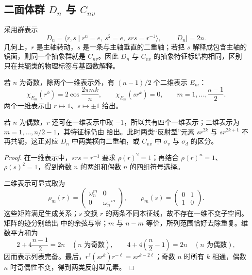 \subsection{\texorpdfstring{二面体群 $D_n$ 与 $C_{nv}$}{二面体群 Dn 与 Cnv}}

采用群表示
\[
D_n=\langle r,s\mid r^n=e,\ s^2=e,\ srs=r^{-1}\rangle,
\qquad |D_n|=2n.
\]
几何上，$r$ 是主轴转动，$s$ 是一条与主轴垂直的二重轴；若把 $s$ 解释成包含主轴的镜面，则同一个抽象群就是 $C_{nv}$。因此 $D_n$ 与 $C_{nv}$ 的抽象特征标结构相同，区别只在共轭类的物理标签与基函数解释。

\begin{theorem}[二面体群的复不可约表示]
若 $n$ 为奇数，除两个一维表示外，有 $(n-1)/2$ 个二维表示 $E_m$：
\begin{equation}
\chi_{E_m}(r^k)=2\cos\frac{2\pi mk}{n},
\qquad
\chi_{E_m}(sr^k)=0,
\qquad
m=1,\dots,\frac{n-1}{2}.
\label{eq:dn-odd-char}
\end{equation}
两个一维表示由 $r\mapsto1$、$s\mapsto\pm1$ 给出。

若 $n$ 为偶数，$r$ 还可在一维表示中取 $-1$，所以共有四个一维表示；二维表示为 $m=1,\dots,n/2-1$，其特征标仍由  给出。此时两类“反射型”元素 $sr^{2k}$ 与 $sr^{2k+1}$ 不再共轭，这正对应 $D_n$ 中两类横向二重轴，或 $C_{nv}$ 中 $\sigma_v$ 与 $\sigma_d$ 的区分。
\end{theorem}
\begin{proof}
在一维表示中，$srs=r^{-1}$ 要求 $\rho(r)^2=1$；再结合 $\rho(r)^n=1$、$\rho(s)^2=1$，得到奇数 $n$ 的两组和偶数 $n$ 的四组符号选择。

二维表示可显式取为
\[
\rho_m(r)=\begin{pmatrix}\omega_n^m&0\\0&\omega_n^{-m}\end{pmatrix},
\qquad
\rho_m(s)=\begin{pmatrix}0&1\\1&0\end{pmatrix}.
\]
这些矩阵满足生成关系；$s$ 交换 $r$ 的两条不同本征线，故不存在一维不变子空间。矩阵的迹分别给出  中的余弦与零；$m$ 与 $n-m$ 等价，所列范围恰好去除重复。维数平方和为
\[
2+4\frac{n-1}{2}=2n\quad(n\text{ 为奇数}),\qquad
4+4\left(\frac n2-1\right)=2n\quad(n\text{ 为偶数}),
\]
因而表示列表完备。最后，$r^\ell(sr^k)r^{-\ell}=sr^{k-2\ell}$；奇数 $n$ 时所有 $k$ 相通，偶数 $n$ 时奇偶性不变，得到两类反射型元素。
\end{proof}

